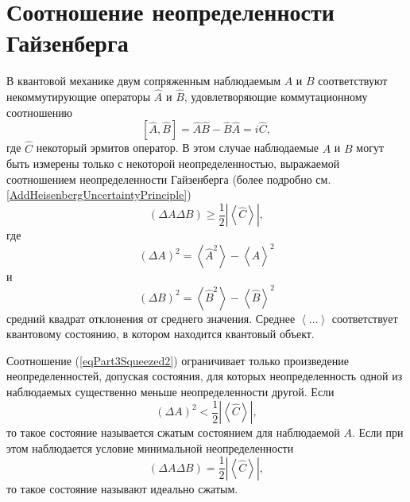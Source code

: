 \section{Соотношение неопределенности Гайзенберга}
В квантовой механике двум сопряженным наблюдаемым $A$ и $B$
соответствуют некоммутирующие операторы $\hat{A}$ и $\hat{B}$,
удовлетворяющие коммутационному соотношению
\begin{equation}
\left[
\hat{A}, \hat{B}
\right] = 
\hat{A}\hat{B} - \hat{B}\hat{A} = i \hat{C},
\nonumber
\end{equation}
где $\hat{C}$ некоторый эрмитов оператор. В этом случае наблюдаемые
$A$ и $B$ могут быть измерены только с некоторой неопределенностью,
выражаемой соотношением неопределенности Гайзенберга
(более подробно см. \autoref{AddHeisenbergUncertaintyPrinciple})
\begin{equation}
\left(
\Delta A \Delta B
\right) \ge \frac{1}{2} \left|\left<\hat{C}\right>\right|,
\label{eqPart3Squeezed2}
\end{equation}
где
\[
\left(\Delta A\right)^2 = \left<\hat{A}^2\right> - \left<\hat{A}\right>^2
\]
и
\[
\left(\Delta B\right)^2 = \left<\hat{B}^2\right> - \left<\hat{B}\right>^2
\]
средний квадрат отклонения от среднего значения. 
Среднее $\left<\dots\right>$ соответствует квантовому состоянию, в
котором находится квантовый объект.

Соотношение (\ref{eqPart3Squeezed2}) ограничивает только произведение
неопределенностей, допуская состояния, для которых неопределенность
одной из наблюдаемых существенно меньше неопределенности другой.
Если 
\begin{equation}
\left(\Delta A\right)^2 < \frac{1}{2} \left|\left<\hat{C}\right>\right|,
\nonumber
\end{equation}
то такое состояние называется сжатым состоянием для наблюдаемой
$A$. Если при этом наблюдается условие минимальной неопределенности
\begin{equation}
\left(
\Delta A \Delta B
\right) = \frac{1}{2} \left|\left<\hat{C}\right>\right|,
\nonumber
\end{equation}
то такое состояние называют идеально сжатым.
